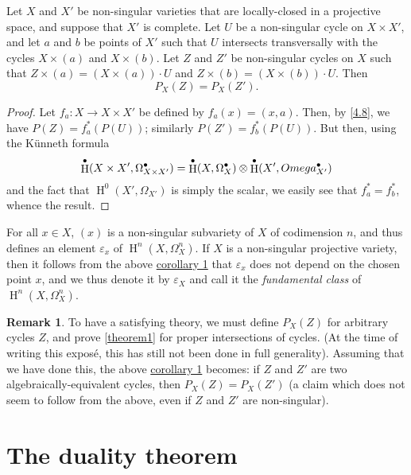 \documentclass{article}
\theoremstyle{plain}
\newenvironment{corollary}[1]
    {\renewcommand\theinnercustomcorollary{#1}\innercustomcorollary}
    {\endinnercustomcorollary}
\theoremstyle{definition}
\newtheorem*{remark}{Remark}
\DeclareMathOperator{\HH}{H}
\newcommand{\oldpage}[1]{\marginpar{\footnotesize$\Big\vert$ \textit{p.~#1}}}
\begin{document}
\oldpage{149-13}
\begin{corollary}{1}
\label{theorem1corollary1}
  Let $X$ and $X'$ be non-singular varieties that are locally-closed in a projective space, and suppose that $X'$ is complete.
  Let $U$ be a non-singular cycle on $X\times X'$, and let $a$ and $b$ be points of $X'$ such that $U$ intersects transversally with the cycles $X\times(a)$ and $X\times(b)$.
  Let $Z$ and $Z'$ be non-singular cycles on $X$ such that $Z\times(a)=(X\times(a))\cdot U$ and $Z\times(b)=(X\times(b))\cdot U$.
  Then
  \[
    P_X(Z) = P_X(Z').
  \]
\end{corollary}

\begin{proof}
  Let $f_a\colon X\to X\times X'$ be defined by $f_a(x)=(x,a)$.
  Then, by \cref{4.8}, we have $P(Z)=f_a^*(P(U))$; similarly $P(Z')=f_b^*(P(U))$.
  But then, using the K\"{u}nneth formula
  \[
    \HH^\bullet(X\times X',\Omega_{X\times X'}^\bullet)
    = \HH^\bullet(X,\Omega_X^\bullet)\otimes\HH^\bullet(X',\\Omega_{X'}^\bullet)
  \]
  and the fact that $\HH^0(X',\Omega_{X'})$ is simply the scalar, we easily see that $f_a^*=f_b^*$, whence the result.
\end{proof}

For all $x\in X$, $(x)$ is a non-singular subvariety of $X$ of codimension $n$, and thus defines an element $\varepsilon_x$ of $\HH^n(X,\Omega_X^n)$.
If $X$ is a non-singular projective variety, then it follows from the above \hyperref[theorem1corollary1]{corollary 1} that $\varepsilon_x$ does not depend on the chosen point $x$, and we thus denote it by $\varepsilon_X$ and call it the \emph{fundamental class} of $\HH^n(X,\Omega_X^n)$.

\begin{remark}
  To have a satisfying theory, we must define $P_X(Z)$ for arbitrary cycles $Z$, and prove \cref{theorem1} for proper intersections of cycles.
  (At the time of writing this expos\'{e}, this has still not been done in full generality).
  Assuming that we have done this, the above \hyperref[theorem1corollary1]{corollary 1} becomes: if $Z$ and $Z'$ are two algebraically-equivalent cycles, then $P_X(Z)=P_X(Z')$ (a claim which does not seem to follow from the above, even if $Z$ and $Z'$ are non-singular).
\end{remark}


\section{The duality theorem}
\label{section5}
\end{document}
